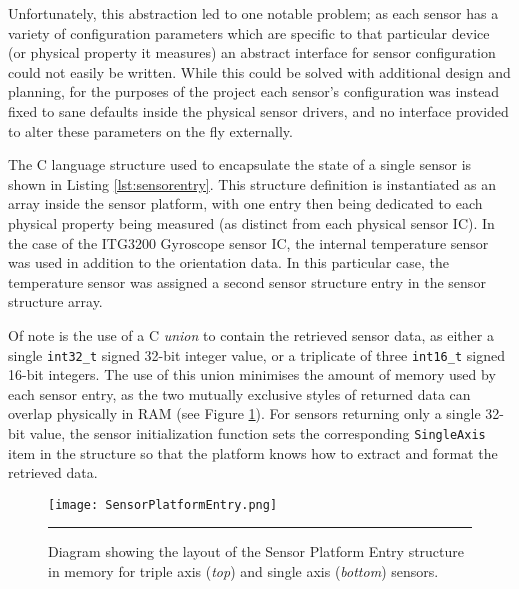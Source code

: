 Unfortunately, this abstraction led to one notable problem; as each sensor has a variety of configuration parameters which are specific to that particular device (or physical property it measures) an abstract interface for sensor configuration could not easily be written. While this could be solved with additional design and planning, for the purposes of the project each sensor's configuration was instead fixed to sane defaults inside the physical sensor drivers, and no interface provided to alter these parameters on the fly externally.

The C language structure used to encapsulate the state of a single sensor is shown in Listing \ref{lst:sensorentry}. This structure definition is instantiated as an array inside the sensor platform, with one entry then being dedicated to each physical property being measured (as distinct from each physical sensor IC). In the case of the ITG3200 Gyroscope sensor IC, the internal temperature sensor was used in addition to the orientation data. In this particular case, the temperature sensor was assigned a second sensor structure entry in the sensor structure array.



Of note is the use of a C \textit{union} to contain the retrieved sensor data, as either a single \lstinline{int32_t} signed 32-bit integer value, or a triplicate of three \lstinline{int16_t} signed 16-bit integers. The use of this union minimises the amount of memory used by each sensor entry, as the two mutually exclusive styles of returned data can overlap physically in RAM (see Figure \ref{fig:sensorentry}). For sensors returning only a single 32-bit value, the sensor initialization function sets the corresponding \lstinline{SingleAxis} item in the structure so that the platform knows how to extract and format the retrieved data.

\begin{figure}[tbph]
	\vspace{1em}
	\centering
		\texttt{[image: SensorPlatformEntry.png]}
	\rule{35em}{0.5pt}
	\caption[Sensor Platform Entry Structure Diagram]{Diagram showing the layout of the Sensor Platform Entry structure in memory for triple axis (\textit{top}) and single axis (\textit{bottom}) sensors.}
	\label{fig:sensorentry}
\end{figure}


